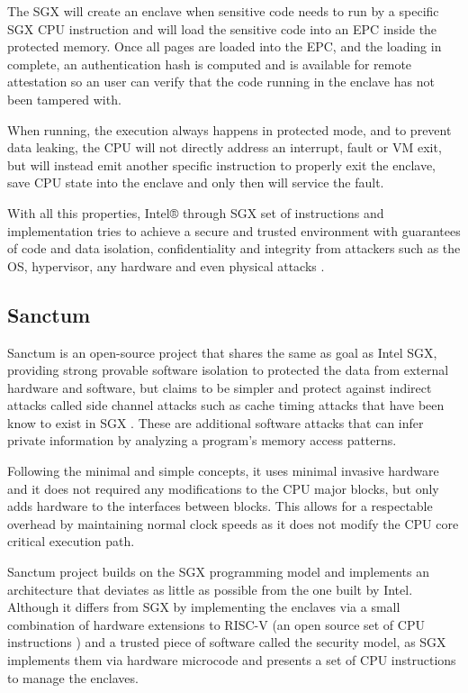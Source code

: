 The \gls{SGX} will create an enclave when sensitive code needs to run by a specific \gls{SGX} CPU instruction and will load the sensitive code into an \gls{EPC} inside the protected memory. Once all pages are loaded into the EPC, and the loading in complete, an authentication hash is computed and is available for remote attestation so an user can verify that the code running in the enclave has not been tampered with.

When running, the execution always happens in protected mode, and to prevent data leaking, the CPU will not directly address an interrupt, fault or VM exit, but will instead emit another specific instruction to properly exit the enclave, save CPU state into the enclave and only then will service the fault.

With all this properties, Intel® through \gls{SGX} set of instructions and implementation tries to achieve a secure and trusted environment with guarantees of code and data isolation, confidentiality and integrity from attackers such as the \gls{OS}, hypervisor, any hardware and even physical attacks \cite{cryptoeprint:2016:086}.

\subsection{Sanctum} %
\label{ssec:sanctum}

Sanctum \cite{cryptoeprint:2015:564} is an open-source project that shares the same as goal as Intel \gls{SGX}, providing strong provable software isolation to protected the data from external hardware and software, but claims to be simpler and protect against indirect attacks called side channel attacks \cite{Khan2014} such as cache timing attacks \cite{cachetimingattaks:1} that have been know to exist in \gls{SGX} \cite{Gtzfried2017} \cite{2017arXiv170208719S}. These are additional software attacks that can infer private information by analyzing a program’s memory access patterns.

Following the minimal and simple concepts, it uses minimal invasive hardware and it does not required any modifications to the CPU major blocks, but only adds hardware to the interfaces between blocks. This allows for a respectable overhead by maintaining normal clock speeds as it does not modify the CPU core critical execution path.

Sanctum project builds on the \gls{SGX} programming model and implements an architecture that deviates as little as possible from the one built by Intel. Although it differs from \gls{SGX} by implementing the enclaves via a small combination of hardware extensions to RISC-V (an open source set of CPU instructions \cite{Waterman14therisc-v}) and a trusted piece of software called the security model, as SGX implements them via hardware microcode and presents a set of CPU instructions to manage the enclaves.

